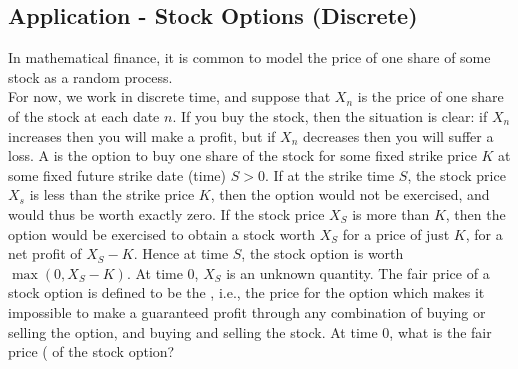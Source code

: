 \documentclass[11pt]{article}
\begin{document}
   	
   	\subsection{Application - Stock Options (Discrete)}
   	In mathematical finance, it is common to model the price of one share of some stock as a random process.\\
   	For now, we work in discrete time, and suppose that $X_n$ is the price of one share of the stock at each date $n$. If you buy the stock, then the situation is clear: if $X_n$ increases then you will make a profit, but if $X_n$ decreases then you will suffer a loss.
   	A  is the option to buy one share of the stock for some fixed strike price $K$ at some fixed future strike date (time) $S > 0$. If at the strike time $S$, the stock price $X_s$ is less than the strike price $K$, then the option would not be exercised, and would thus be worth exactly zero. If the stock price $X_S$ is more than $K$, then the option would be exercised to obtain a stock worth $X_S$ for a price of just $K$, for a net profit of $X_S - K$. Hence at time $S$, the stock option is worth $\max(0, X_S - K)$.
   	\remark
   	At time 0, $X_S$ is an unknown quantity. The fair price of a stock option is defined to be the , i.e., the price for the option which makes it impossible to make a guaranteed profit through any combination of buying or selling the option, and buying and selling the stock.
   	At time 0, what is the fair price ( of the stock option?
   	
\end{document}
